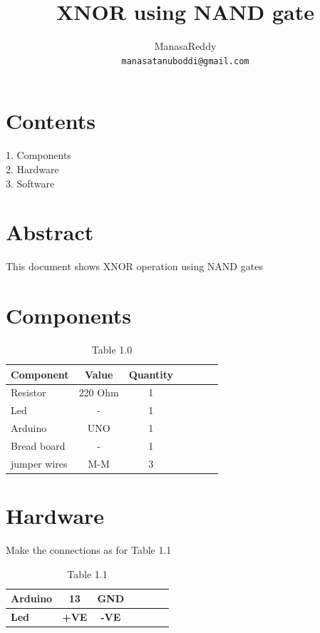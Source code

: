 \documentclass{article}
\begin{document}
\title{XNOR using NAND gate}

\author{ManasaReddy\\
  {\tt manasatanuboddi@gmail.com}}

\date{}
\maketitle
\section{Contents}
1. Components\\
2. Hardware\\
3. Software\\
\section {Abstract}
This document shows XNOR operation using NAND gates

\section{Components}
\begin{table}[htbp]
 \begin{center}
    \begin{tabular}{|l|c|c|c|c|c|c|} \hline 
  \textbf{Component} & \textbf{Value} & \textbf{Quantity} \\
 \hline
Resistor & 220 Ohm & 1 \\ \hline
Led & - & 1\\ \hline
Arduino & UNO & 1 \\ \hline
Bread board & - & 1 \\ \hline
jumper wires& M-M& 3 \\ \hline
\end{tabular}   
\end{center}
\caption{\label{table:dummytable} Table 1.0}
\end{table}



\section{Hardware}
Make the connections as for Table 1.1
\begin{table}[htbp]
 \begin{center}
    \begin{tabular}{|l|c|c|c|c|c|c|} \hline 
 \textbf{Arduino} & \textbf{13} & \textbf{GND} \\ \hline
 \textbf{Led} & \textbf{+VE} & \textbf{-VE}\\ \hline
\end{tabular}   
\end{center}
\caption{\label{table:dummytable} Table 1.1}
\end{table}
\end{document}
